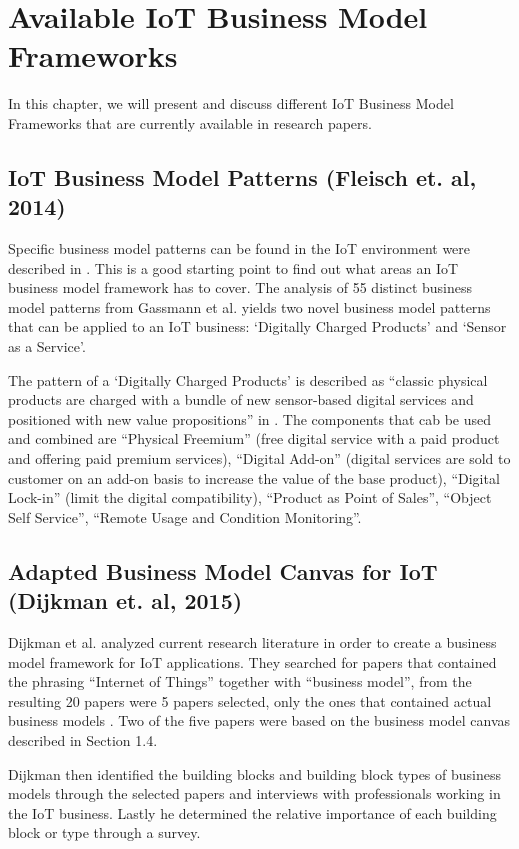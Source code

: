 \section{Available IoT Business Model Frameworks}
	In this chapter, we will present and discuss different IoT Business Model Frameworks that are currently available in research papers.
	\subsection{IoT Business Model Patterns (Fleisch et. al, 2014)}
		Specific business model patterns can be found in the IoT environment were described in \cite{fleisch}. This is a good starting point to find out what areas an IoT business model framework has to cover. The analysis of 55 distinct business model patterns from Gassmann et al. \cite{gassmann55} yields two novel business model patterns that can be applied to an IoT business: `Digitally Charged Products' and `Sensor as a Service'.

		The pattern of a `Digitally Charged Products' is described as ``classic physical products are charged with a bundle
		of new sensor-based digital services and positioned with new value propositions'' in \cite[p. 10]{fleisch}. The components that cab be used and combined are ``Physical Freemium'' (free digital service with a paid product and offering paid premium services), ``Digital Add-on'' (digital services are sold to customer on an add-on basis to increase the value of the base product), ``Digital Lock-in'' (limit the digital compatibility), ``Product as Point of Sales'', ``Object Self Service'', ``Remote Usage and Condition Monitoring''. 

	\subsection{Adapted Business Model Canvas for IoT (Dijkman et. al, 2015)}
		Dijkman et al. analyzed current research literature in order to create a business model framework for IoT applications. They searched for papers that contained the phrasing ``Internet of Things'' together with ``business model'', from the resulting 20 papers were 5 papers selected, only the ones that contained actual business models \cite{dijkman}. Two of the five papers were based on the business model canvas described in Section 1.4.

		Dijkman then identified the building blocks and building block types of business models through the selected papers and interviews with professionals working in the IoT business. Lastly he determined the relative importance of each building block or type through a survey.

